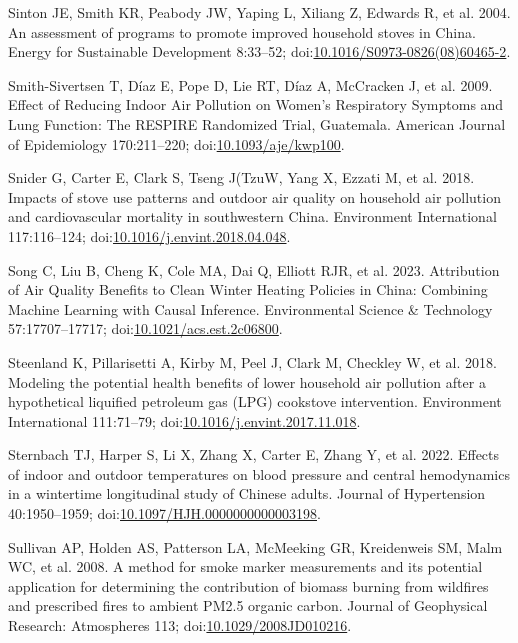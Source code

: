 \documentclass[
  letterpaper,
  DIV=11,
  numbers=noendperiod]{scrartcl}
\newlength{\cslhangindent}
\newenvironment{CSLReferences}[2] %
 {\begin{list}{}{%
  \setlength{\itemindent}{0pt}
  \setlength{\leftmargin}{0pt}
  \setlength{\parsep}{0pt}
  \ifodd #1
   \setlength{\leftmargin}{\cslhangindent}
   \setlength{\itemindent}{-1\cslhangindent}
  \fi
  \setlength{\itemsep}{#2\baselineskip}}}
 {\end{list}}
\begin{document}
\begin{CSLReferences}{1}{1}
Sinton JE, Smith KR, Peabody JW, Yaping L, Xiliang Z, Edwards R, et al.
2004. An assessment of programs to promote improved household stoves in
{China}. Energy for Sustainable Development 8:33--52;
doi:\href{https://doi.org/10.1016/S0973-0826(08)60465-2}{10.1016/S0973-0826(08)60465-2}.

Smith-Sivertsen T, Díaz E, Pope D, Lie RT, Díaz A, McCracken J, et al.
2009. Effect of {Reducing Indoor Air Pollution} on {Women}'s
{Respiratory Symptoms} and {Lung Function}: {The RESPIRE Randomized
Trial}, {Guatemala}. American Journal of Epidemiology 170:211--220;
doi:\href{https://doi.org/10.1093/aje/kwp100}{10.1093/aje/kwp100}.

Snider G, Carter E, Clark S, Tseng J(TzuW, Yang X, Ezzati M, et al.
2018. Impacts of stove use patterns and outdoor air quality on household
air pollution and cardiovascular mortality in southwestern {China}.
Environment International 117:116--124;
doi:\href{https://doi.org/10.1016/j.envint.2018.04.048}{10.1016/j.envint.2018.04.048}.

Song C, Liu B, Cheng K, Cole MA, Dai Q, Elliott RJR, et al. 2023.
Attribution of {Air Quality Benefits} to {Clean Winter Heating Policies}
in {China}: {Combining Machine Learning} with {Causal Inference}.
Environmental Science \& Technology 57:17707--17717;
doi:\href{https://doi.org/10.1021/acs.est.2c06800}{10.1021/acs.est.2c06800}.

Steenland K, Pillarisetti A, Kirby M, Peel J, Clark M, Checkley W, et
al. 2018. Modeling the potential health benefits of lower household air
pollution after a hypothetical liquified petroleum gas ({LPG}) cookstove
intervention. Environment International 111:71--79;
doi:\href{https://doi.org/10.1016/j.envint.2017.11.018}{10.1016/j.envint.2017.11.018}.

Sternbach TJ, Harper S, Li X, Zhang X, Carter E, Zhang Y, et al. 2022.
Effects of indoor and outdoor temperatures on blood pressure and central
hemodynamics in a wintertime longitudinal study of {Chinese} adults.
Journal of Hypertension 40:1950--1959;
doi:\href{https://doi.org/10.1097/HJH.0000000000003198}{10.1097/HJH.0000000000003198}.

Sullivan AP, Holden AS, Patterson LA, McMeeking GR, Kreidenweis SM, Malm
WC, et al. 2008. A method for smoke marker measurements and its
potential application for determining the contribution of biomass
burning from wildfires and prescribed fires to ambient {PM2}.5 organic
carbon. Journal of Geophysical Research: Atmospheres 113;
doi:\href{https://doi.org/10.1029/2008JD010216}{10.1029/2008JD010216}.


\end{CSLReferences}
\end{document}
